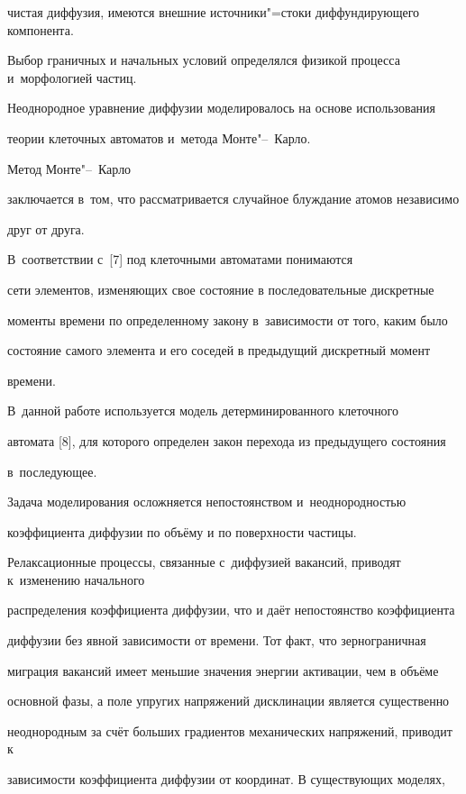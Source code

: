 чистая диффузия,  имеются внешние источники"=стоки диффундирующего компонента.

Выбор граничных и начальных условий определялся физикой процесса и~морфологией частиц.



Неоднородное уравнение диффузии моделировалось на основе использования

теории клеточных автоматов и~метода Монте"--~Карло.

Метод Монте"--~Карло

заключается в~том,  что рассматривается случайное блуждание атомов независимо

друг от друга.

В~соответствии с~[7] под клеточными автоматами понимаются

сети элементов,  изменяющих свое состояние в последовательные дискретные

моменты времени по определенному закону в~зависимости от того,  каким было

состояние самого элемента и его соседей в предыдущий дискретный момент

времени.

В~данной работе используется модель детерминированного клеточного

автомата [8],  для которого определен закон перехода из предыдущего состояния

в~последующее.





Задача моделирования осложняется непостоянством и~неоднородностью

коэффициента диффузии по объёму и по поверхности частицы.

Релаксационные процессы,  связанные с~диффузией вакансий,  приводят к~изменению начального

распределения коэффициента диффузии,  что и даёт непостоянство коэффициента

диффузии без явной зависимости от времени. Тот факт,  что зернограничная

миграция вакансий имеет меньшие значения энергии активации,  чем в объёме

основной фазы,  а поле упругих напряжений дисклинации является существенно

неоднородным за счёт больших градиентов механических напряжений,  приводит к

зависимости коэффициента диффузии от координат. В существующих моделях,


